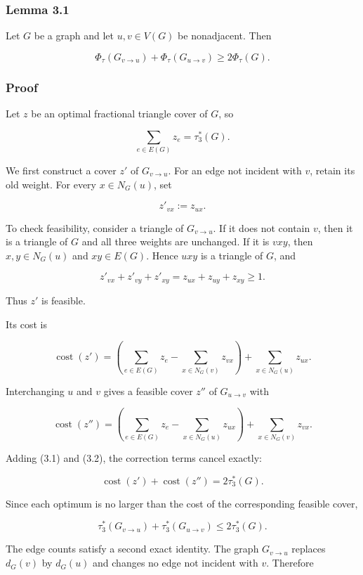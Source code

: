 \documentclass[
  11pt,
]{article}
\begin{document}
\subsubsection{Lemma 3.1}\label{lemma-3.1}

Let \(G\) be a graph and let \(u,v\in V(G)\) be nonadjacent. Then

\[
\boxed{
\Phi_\tau(G_{v\to u})
+
\Phi_\tau(G_{u\to v})
\ge
2\Phi_\tau(G).
}
\]

\subsubsection{Proof}\label{proof-1}

Let \(z\) be an optimal fractional triangle cover of \(G\), so

\[
\sum_{e\in E(G)}z_e=\tau_3^*(G).
\]

We first construct a cover \(z'\) of \(G_{v\to u}\). For an edge not
incident with \(v\), retain its old weight. For every \(x\in N_G(u)\),
set

\[
z'_{vx}:=z_{ux}.
\]

To check feasibility, consider a triangle of \(G_{v\to u}\). If it does
not contain \(v\), then it is a triangle of \(G\) and all three weights
are unchanged. If it is \(vxy\), then \(x,y\in N_G(u)\) and
\(xy\in E(G)\). Hence \(uxy\) is a triangle of \(G\), and

\[
z'_{vx}+z'_{vy}+z'_{xy}
=
z_{ux}+z_{uy}+z_{xy}
\ge1.
\]

Thus \(z'\) is feasible.

Its cost is

\[
\operatorname{cost}(z')
=
\left(
\sum_{e\in E(G)}z_e
-
\sum_{x\in N_G(v)}z_{vx}
\right)
+
\sum_{x\in N_G(u)}z_{ux}.
\tag{3.1}
\]

Interchanging \(u\) and \(v\) gives a feasible cover \(z''\) of
\(G_{u\to v}\) with

\[
\operatorname{cost}(z'')
=
\left(
\sum_{e\in E(G)}z_e
-
\sum_{x\in N_G(u)}z_{ux}
\right)
+
\sum_{x\in N_G(v)}z_{vx}.
\tag{3.2}
\]

Adding (3.1) and (3.2), the correction terms cancel exactly:

\[
\operatorname{cost}(z')
+
\operatorname{cost}(z'')
=
2\tau_3^*(G).
\]

Since each optimum is no larger than the cost of the corresponding
feasible cover,

\[
\tau_3^*(G_{v\to u})
+
\tau_3^*(G_{u\to v})
\le
2\tau_3^*(G).
\tag{3.3}
\]

The edge counts satisfy a second exact identity. The graph
\(G_{v\to u}\) replaces \(d_G(v)\) by \(d_G(u)\) and changes no edge not
incident with \(v\). Therefore
\end{document}
